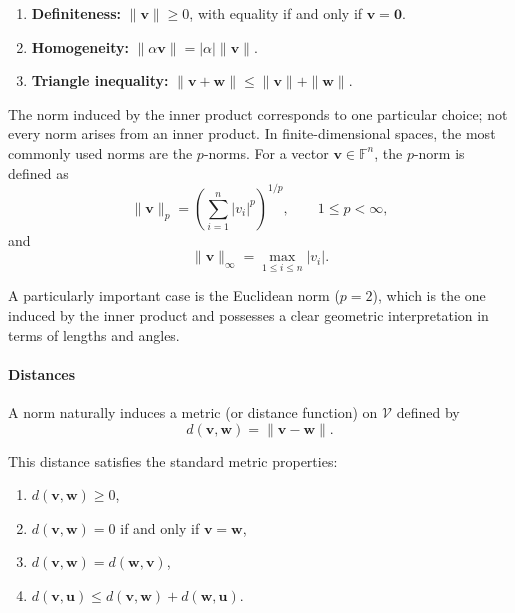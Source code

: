 \begin{enumerate}
    \item \textbf{Definiteness:} $\|\mathbf{v}\| \ge 0$, with equality if and only if $\mathbf{v} = \mathbf{0}$.
    \item \textbf{Homogeneity:} $\|\alpha \mathbf{v}\| = |\alpha| \|\mathbf{v}\|$.
    \item \textbf{Triangle inequality:} $\|\mathbf{v} + \mathbf{w}\| \le \|\mathbf{v}\| + \|\mathbf{w}\|$.
\end{enumerate}
The norm induced by the inner product corresponds to one particular choice; not every norm arises from an inner product. In finite-dimensional spaces, the most commonly used norms are the $p$-norms. For a vector $\mathbf{v} \in \mathbb{F}^n$, the $p$-norm is defined as
\begin{equation}
    \|\mathbf{v}\|_p = \left( \sum_{i=1}^{n} |v_i|^p \right)^{1/p}, 
    \qquad 1 \le p < \infty,
\end{equation}
and
\begin{equation}
    \|\mathbf{v}\|_\infty = \max_{1 \le i \le n} |v_i|.
\end{equation}

A particularly important case is the Euclidean norm ($p=2$), which is the one induced by the inner product and possesses a clear geometric interpretation in terms of lengths and angles.

\paragraph{Distances}

A norm naturally induces a metric (or distance function) on $\mathcal{V}$ defined by
\begin{equation}
    d(\mathbf{v}, \mathbf{w}) = \|\mathbf{v} - \mathbf{w}\|.
\end{equation}

This distance satisfies the standard metric properties:
\begin{enumerate}
    \item $d(\mathbf{v}, \mathbf{w}) \ge 0$,
    \item $d(\mathbf{v}, \mathbf{w}) = 0$ if and only if $\mathbf{v} = \mathbf{w}$,
    \item $d(\mathbf{v}, \mathbf{w}) = d(\mathbf{w}, \mathbf{v})$,
    \item $d(\mathbf{v}, \mathbf{u}) \le d(\mathbf{v}, \mathbf{w}) + d(\mathbf{w}, \mathbf{u})$.
\end{enumerate}

